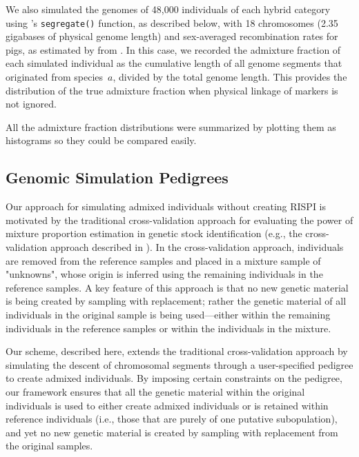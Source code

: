 We also simulated the genomes of 48,000 individuals of each
hybrid category using \gscramble{}'s {\footnotesize\tt segregate()} function, as described
below, with 18 chromosomes (2.35 gigabases of physical genome length)  and
sex-averaged recombination rates
for pigs, as estimated by from \citet{tortereau2012high}. In this case, we recorded the
admixture fraction of each simulated individual as the cumulative length of all genome segments
that originated from species~$a$, divided by the total genome length.  This provides the distribution of the true admixture fraction
when physical linkage of markers is not ignored.  

All the admixture fraction distributions were summarized by plotting them as histograms
so they could be compared easily.  


\subsection*{Genomic Simulation Pedigrees}

Our approach for simulating admixed individuals without creating RISPI is motivated by the traditional cross-validation
approach for evaluating the power of mixture proportion
estimation in genetic stock identification (e.g., the cross-validation approach
described in \citealt{moran2019bayesian}).
In the cross-validation approach, individuals are removed from the reference
samples and placed in a mixture sample of "unknowns", whose origin
is inferred using the remaining individuals in the reference samples.  A key
feature of this approach is that no new genetic material is being created by
sampling with replacement; rather the genetic material of all individuals
in the original sample is being used---either within the remaining individuals in the
reference samples or within the individuals in the mixture.

Our scheme, described here, extends the traditional cross-validation approach
by simulating the descent of chromosomal segments through a user-specified
pedigree to create admixed individuals.  By imposing certain constraints
on the pedigree, our framework ensures that all the genetic material
within the original individuals is used to either create admixed individuals or is retained
within reference individuals (i.e., those that are purely of one
putative subopulation), and yet no new genetic material is
created by sampling with replacement from the original samples.


